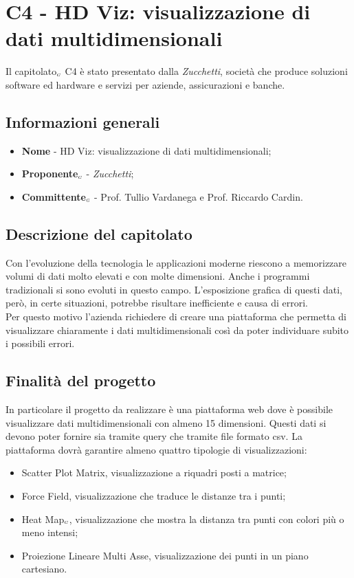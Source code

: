 \chapter{C4 - HD Viz: visualizzazione di dati multidimensionali} \label{CapitolatoC4}
Il capitolato$_{\scaleto{G}{3pt}}$ C4 è stato presentato dalla \textit{Zucchetti}, società che produce soluzioni software ed hardware e servizi per aziende, assicurazioni e banche.
\section{Informazioni generali} \label{C4InformazioniGenerali}
\begin{itemize}
	\item \textbf{Nome} - HD Viz: visualizzazione di dati multidimensionali;
	\item \textbf{Proponente}$_{\scaleto{G}{3pt}}$ - \textit{Zucchetti};
	\item \textbf{Committente}$_{\scaleto{G}{3pt}}$ - Prof. Tullio Vardanega e Prof. Riccardo Cardin.
\end{itemize}
\section{Descrizione del capitolato} \label{C4DescrizioneDelCapitolato}
Con l'evoluzione della tecnologia le applicazioni moderne riescono a memorizzare volumi di dati molto elevati e con molte dimensioni. Anche i programmi tradizionali si sono evoluti in questo campo. L'esposizione grafica di questi dati, però, in certe situazioni, potrebbe risultare inefficiente e causa di errori. \\
Per questo motivo l'azienda richiedere di creare una piattaforma che permetta di visualizzare chiaramente i dati multidimensionali così da poter individuare subito i possibili errori.
\section{Finalità del progetto} \label{C4FinalitàDelProgetto}
In particolare il progetto da realizzare è una piattaforma web dove è possibile visualizzare dati multidimensionali con almeno 15 dimensioni. Questi dati si devono poter fornire sia tramite query che tramite file formato csv. La piattaforma dovrà garantire almeno quattro tipologie di visualizzazioni:
\begin{itemize}
	\item Scatter Plot Matrix, visualizzazione a riquadri posti a matrice;
	\item Force Field, visualizzazione che traduce le distanze tra i punti;
	\item Heat Map$_{\scaleto{G}{3pt}}$, visualizzazione che mostra la distanza tra punti con colori più o meno intensi;
	\item Proiezione Lineare Multi Asse, visualizzazione dei punti in un piano cartesiano.
\end{itemize}
